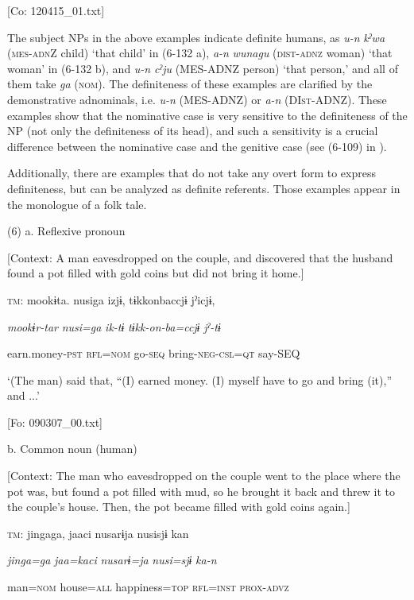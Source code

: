       [Co: 120415\_01.txt]

The subject NPs in the above examples indicate definite humans, as \textit{u-n} \textit{kˀwa} (\textsc{mes}-\textsc{adn}Z child) ‘that child’ in (6-132 a), \textit{a-n} \textit{wunagu} (\textsc{dist}-\textsc{adnz} woman) ‘that woman’ in (6-132 b), and \textit{u-n} \textit{cˀju} (MES-ADNZ person) ‘that person,’ and all of them take \textit{ga} (\textsc{nom}). The definiteness of these examples are clarified by the demonstrative adnominals, i.e. \textit{u-n} (MES-ADNZ) or \textit{a-n} (DI\textsc{st}-ADNZ). These examples show that the nominative case is very sensitive to the definiteness of the NP (not only the definiteness of its head), and such a sensitivity is a crucial difference between the nominative case and the genitive case (see (6-109) in ).

  Additionally, there are examples that do not take any overt form to express definiteness, but can be analyzed as definite referents. Those examples appear in the monologue of a folk tale.

(6)  a.  Reflexive pronoun

    [Context: A man eavesdropped on the couple, and discovered that the husband found a pot filled with gold coins but did not bring it home.]

    \textsc{tm}:  mookɨta.  nusiga  izjɨ,  tɨkkonbaccjɨ  jˀicjɨ,

      \textit{mookɨr-tar}  \textit{nusi=ga}  \textit{ik-tɨ}  \textit{tɨkk-on-ba=ccjɨ}  \textit{jˀ-tɨ}

      earn.money-\textsc{pst}  \textsc{rfl}=\textsc{nom}  go-\textsc{seq}  bring-\textsc{neg}-\textsc{csl}=\textsc{qt}  say-SEQ

      ‘(The man) said that, “(I) earned money. (I) myself have to go and bring (it),” and ...’

      [Fo: 090307\_00.txt]

  b.  Common noun (human)

    [Context: The man who eavesdropped on the couple went to the place where the pot was, but found a pot filled with mud, so he brought it back and threw it to the couple’s house. Then, the pot became filled with gold coins again.]

    \textsc{tm}:  jingaga,  jaaci  nusarɨja  nusisjɨ  kan

      \textit{jinga=ga}  \textit{jaa=kaci}  \textit{nusarɨ=ja}  \textit{nusi=sjɨ}  \textit{ka-n}

      man=\textsc{nom}  house=\textsc{all}  happiness=\textsc{top}  \textsc{rfl}=\textsc{inst}  \textsc{prox}-\textsc{advz}

